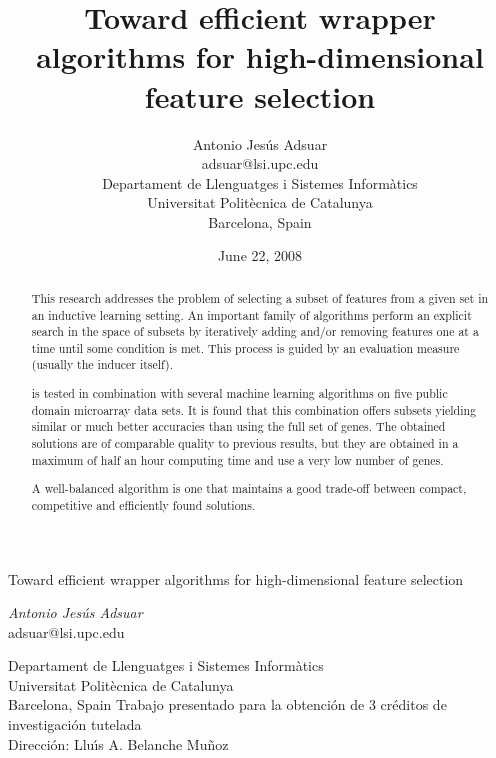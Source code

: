 \documentclass{article}
\begin{document}
\title{Toward efficient wrapper algorithms for high-dimensional feature selection}
\author{
Antonio Jes\'us Adsuar\\
adsuar@lsi.upc.edu\\
Departament de Llenguatges i Sistemes Inform\`atics\\
Universitat Polit\`ecnica de Catalunya\\
Barcelona, Spain}

\newpage
\vfil\noindent
{\huge Toward efficient wrapper algorithms for high-dimensional feature selection}

\vfil\noindent
{\Large\em Antonio Jes\'us Adsuar}\\
adsuar@lsi.upc.edu\\
\vfil

\noindent
Departament de Llenguatges i Sistemes Inform\`atics\\
Universitat Polit\`ecnica de Catalunya\\
Barcelona, Spain
\vfil
{\flushright Trabajo presentado para la obtenci\'on de 3 cr\'editos de
investigaci\'on tutelada}\\
Direcci\'on: Llu\'{\i}s A. Belanche Mu\~{n}oz
\newpage

\date{June 22, 2008}  
\maketitle

\begin{abstract}
\noindent
This research addresses the problem of selecting a subset of features from
a given set in an inductive learning setting. An important family of
algorithms perform an explicit search in the space of subsets by
iteratively adding and/or removing features one at a time until some
condition is met. This process is guided by an evaluation measure
(usually the inducer itself).

is tested in combination
with several machine learning algorithms on five public domain
microarray data sets. It is found that this combination offers subsets
yielding similar or much better accuracies than using the full set of
genes. The obtained solutions are of comparable quality to previous results, 
but they are obtained in a maximum of half an hour computing
time and use a very low number of genes.

A well-balanced algorithm is one that maintains a good trade-off
between compact, competitive and efficiently found solutions. 


\end{abstract}
\end{document}
